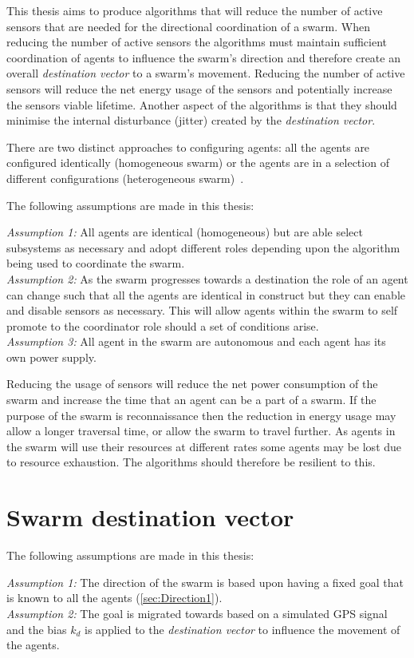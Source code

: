 This thesis aims to produce algorithms that will reduce the number of active sensors that are needed for the directional coordination of a swarm. When reducing the number of active sensors the algorithms must maintain sufficient coordination of agents to influence the swarm's direction and therefore create an overall \textit{destination vector} to a swarm's movement. Reducing the number of active sensors will reduce the net energy usage of the sensors and potentially increase the sensors viable lifetime. Another aspect of the algorithms is that they should minimise the internal disturbance (jitter) created by the \textit{destination vector}.

There are two distinct approaches to configuring agents: all the agents are configured identically (homogeneous swarm) or the agents are in a selection of different configurations (heterogeneous swarm)~\cite{BS:13}. 

The following assumptions are made in this thesis:

\textit{Assumption 1:} All agents are identical (homogeneous) but are able select subsystems as necessary and adopt different roles depending upon the algorithm being used to coordinate the swarm. \\
\textit{Assumption 2:} As the swarm progresses towards a destination the role of an agent can change such that all the agents are identical in construct but they can enable and disable sensors as necessary. This will allow agents within the swarm to self promote to the coordinator role should a set of conditions arise.\\
\textit{Assumption 3:} All agent in the swarm are autonomous and each agent has its own power supply. 

Reducing the usage of sensors will reduce the net power consumption of the swarm and increase the time that an agent can be a part of a swarm. If the purpose of the swarm is reconnaissance then the reduction in energy usage may allow a longer traversal time, or allow the swarm to travel further. As agents in the swarm will use their resources at different rates some agents may be lost due to resource exhaustion. The algorithms should therefore be resilient to this.

\section{Swarm destination vector}
The following assumptions are made in this thesis:

\textit{Assumption 1:} The direction of the swarm is based upon having a fixed goal that is known to all the agents (\autoref{sec:Direction1}). \\
\textit{Assumption 2:} The goal is migrated towards based on a simulated GPS signal and the bias $k_d$ is applied to the \textit{destination vector} to influence the movement of the agents. 

